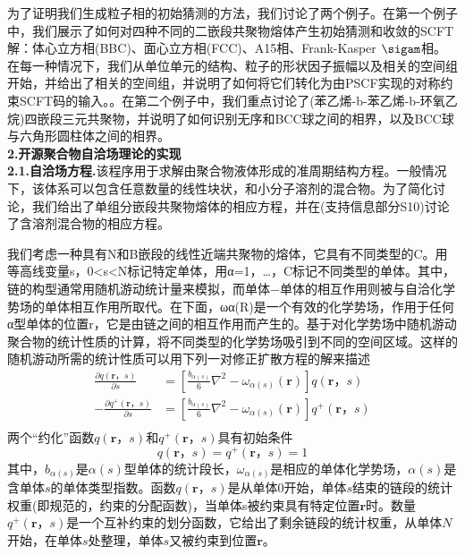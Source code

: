 \documentclass[12pt，a4paper]{article}
\numberwithin{equation}{section}
\begin{document}
为了证明我们生成粒子相的初始猜测的方法，我们讨论了两个例子。在第一个例子中，我们展示了如何对四种不同的二嵌段共聚物熔体产生初始猜测和收敛的SCFT解：体心立方相(BBC)、面心立方相(FCC)、A15相、Frank-Kasper$~\sigam$相。在每一种情况下，我们从单位单元的结构、粒子的形状因子振幅以及相关的空间组开始，并给出了相关的空间组，并说明了如何将它们转化为由PSCF实现的对称约束SCFT码的输入。。在第二个例子中，我们重点讨论了(苯乙烯-b-苯乙烯-b-环氧乙烷)四嵌段三元共聚物，并说明了如何识别无序和BCC球之间的相界，以及BCC球与六角形圆柱体之间的相界。\\
\textbf{2.开源聚合物自洽场理论的实现}\\
\textbf{2.1.自洽场方程.}该程序用于求解由聚合物液体形成的准周期结构方程。一般情况下，该体系可以包含任意数量的线性块状，和小分子溶剂的混合物。为了简化讨论，我们给出了单组分嵌段共聚物熔体的相应方程，并在(支持信息部分S10)讨论了含溶剂混合物的相应方程。

我们考虑一种具有N和B嵌段的线性近端共聚物的熔体，它具有不同类型的C。用等高线变量s，0<s<N标记特定单体，用α=1，…，C标记不同类型的单体。其中，链的构型通常用随机游动统计量来模拟，而单体−单体的相互作用则被与自洽化学势场的单体相互作用所取代。在下面，ωα(R)是一个有效的化学势场，作用于任何α型单体的位置r，它是由链之间的相互作用而产生的。基于对化学势场中随机游动聚合物的统计性质的计算，将不同类型的化学势场吸引到不同的空间区域。这样的随机游动所需的统计性质可以用下列一对修正扩散方程的解来描述
\begin{equation}\label{1}
\begin{aligned}
\frac{\partial q(\mathbf{r}，s)}{\partial s} & = \left[ \frac{b_{\alpha (s)}}{6}\nabla ^2 - \omega_{\alpha (s)}(\mathbf{r}) \right]q(\mathbf{r}，s)\\
-\frac{\partial q^{+}(\mathbf{r}，s)}{\partial s} & = \left[ \frac{b_{\alpha (s)}}{6}\nabla ^2 - \omega_{\alpha (s)}(\mathbf{r}) \right]q^{+}(\mathbf{r}，s)\\
\end{aligned}
\end{equation}
两个“约化”函数$q(\mathbf{r}，s)$和$q^{+}(\mathbf{r}，s)$具有初始条件
\begin{equation}\label{2}
q(\mathbf{r}，s)=q^{+}(\mathbf{r}，s)=1
\end{equation}
其中，$b_{\alpha (s)}$是$\alpha (s)$型单体的统计段长，$\omega_{\alpha (s)}$是相应的单体化学势场，$\alpha (s)$是含单体$s$的单体类型指数。函数$q(\mathbf{r}，s)$是从单体$0$开始，单体$s$结束的链段的统计权重(即规范的，约束的分配函数)，当单体s被约束具有特定位置$\mathbf{r}$时。数量$q^{+}(\mathbf{r}，s)$是一个互补约束的划分函数，它给出了剩余链段的统计权重，从单体$N$开始，在单体$s$处整理，单体$s$又被约束到位置$\mathbf{r}$。
\end{document}
